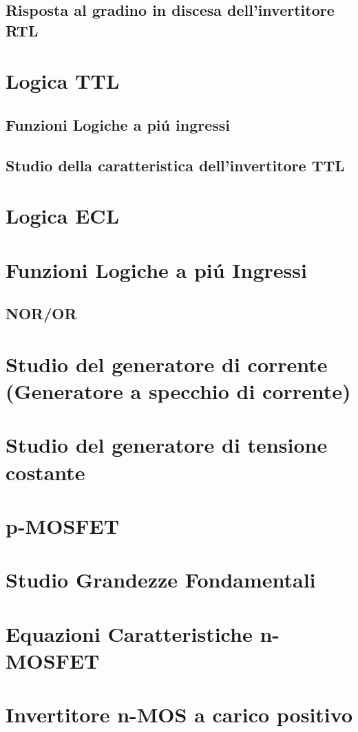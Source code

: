\documentclass{article}
\begin{document}
\subsection{Risposta al gradino in discesa dell'invertitore RTL}
\section{Logica TTL}
\subsection{Funzioni Logiche a pi\'u ingressi}
\subsection{Studio della caratteristica dell'invertitore TTL}
\section{Logica ECL}
\section{Funzioni Logiche a pi\'u Ingressi}
\subsection{NOR/OR}
\section{Studio del generatore di corrente (Generatore a specchio di corrente)}
\section{Studio del generatore di tensione costante}
\section{p-MOSFET}
\section{Studio Grandezze Fondamentali}
\section{Equazioni Caratteristiche n-MOSFET}
\section{Invertitore n-MOS a carico positivo}
\newpage
\end{document}

